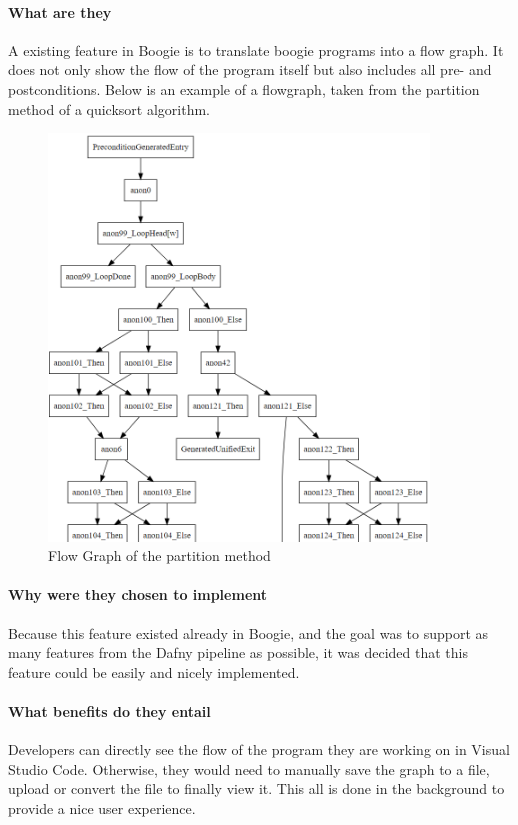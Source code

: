 \paragraph{What are they}
A existing feature in Boogie is to translate boogie programs into a flow graph. It does not only show the flow of the program itself but also includes all pre- and postconditions. Below is an example of a flowgraph, taken from the partition method of a quicksort algorithm.\newline  
\begin{figure}[H]
	\centering
	\includegraphics[width=0.9\textwidth]{img/flowgraph}
	\caption{Flow Graph of the partition method}
	\label{fig:flowgraph}
\end{figure}
\paragraph{Why were they chosen to implement}
Because this feature existed already in Boogie, and the goal was to support as many features from the Dafny pipeline as possible, it was decided that this feature could be easily and nicely implemented. 
\paragraph{What benefits do they entail}
Developers can directly see the flow of the program they are working on in Visual Studio Code. Otherwise, they would need to manually save the graph to a file, upload or convert the file to finally view it. This all is done in the background to provide a nice user experience.

